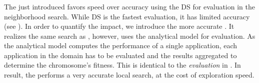 \subsubsection{\gaana}

The just introduced \emph{\gads} favors speed over accuracy using the DS for evaluation in the neighborhood search. While DS is the fastest evaluation, it has limited accuracy (see ). In order to quantify the impact, we introduce the more accurate \emph{\gaana}. It realizes the same search as \emph{\gads}, however, uses the analytical model for evaluation. As the analytical model computes the performance of a single application, each application in the domain has to be evaluated and the results aggregated to determine the chromosome's fitness. This is identical to the \emph{evaluation} in \emph{\garand}. In result, the \gaana performs a very accurate local search, at the cost of exploration speed. 